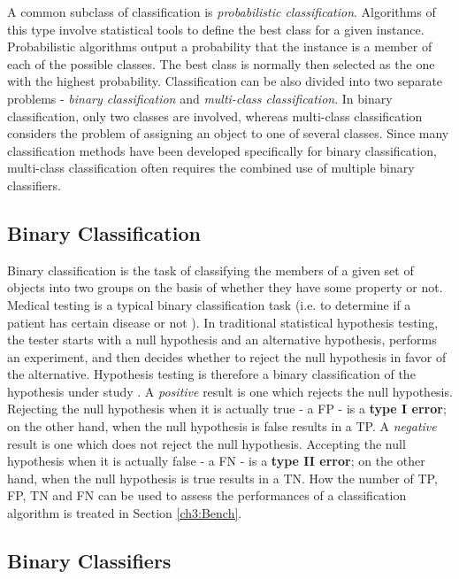 A common subclass of classification is \textit{probabilistic classification}. Algorithms of this type involve statistical tools to define the best class for a given instance\cite{ML_gaussian}.
Probabilistic algorithms output a probability that the instance is a member of each of the possible classes. The best class is normally then selected as the one with the highest probability.
Classification can be also divided into two separate problems - \textit{binary classification} and \textit{multi-class classification}.
In binary classification, only two classes are involved, whereas multi-class classification considers the problem of assigning an object to one of several classes.
Since many classification methods have been developed specifically for binary classification, multi-class classification often requires the combined use of multiple binary classifiers.

\subsection{Binary Classification}

Binary classification is the task of classifying the members of a given set of objects into two groups on the basis of whether they have some property or not\cite{scholkopf2002learning}.
Medical testing is a typical binary classification task (i.e. to determine if a patient has certain disease or not ).
In traditional statistical hypothesis testing, the tester starts with a null hypothesis and an alternative hypothesis,
performs an experiment, and then decides whether to reject the null hypothesis in favor of the alternative.
Hypothesis testing is therefore a binary classification of the hypothesis under study \cite{mitchML}.
A \textit{positive} result is one which rejects the null hypothesis.
Rejecting the null hypothesis when it is actually true - a \Gls{FP} - is a \textbf{type I error};
on the other hand, when the null hypothesis is false results in a \Gls{TP}.
A \textit{negative} result is one which does not reject the null hypothesis.
Accepting the null hypothesis when it is actually false - a \Gls{FN} - is a \textbf{type II error};
on the other hand, when the null hypothesis is true results in a \Gls{TN}.
How the number of \Gls{TP}, \Gls{FP}, \Gls{TN} and \Gls{FN} can be used to assess the performances of a classification algorithm is treated in Section \ref{ch3:Bench}.


\subsection{Binary Classifiers}

